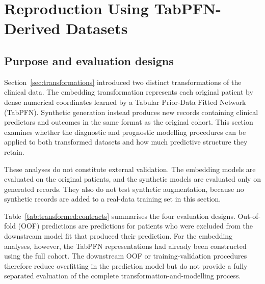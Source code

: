 \section{Reproduction Using TabPFN-Derived Datasets}
\label{sec:transformed-reproduction}

\subsection{Purpose and evaluation designs}

Section~\ref{sec:transformations} introduced two distinct transformations of the
clinical data.  The embedding transformation represents each original patient by
dense numerical coordinates learned by a Tabular Prior-Data Fitted Network
(TabPFN).  Synthetic generation instead produces new records containing clinical
predictors and outcomes in the same format as the original cohort.  This section
examines whether the diagnostic and prognostic modelling procedures can be applied
to both transformed datasets and how much predictive structure they retain.

These analyses do not constitute external validation.  The embedding models are
evaluated on the original patients, and the synthetic models are evaluated only on
generated records.  They also do not test synthetic augmentation, because no
synthetic records are added to a real-data training set in this section.

Table~\ref{tab:transformed:contracts} summarises the four evaluation designs.
Out-of-fold (OOF) predictions are predictions for patients who were excluded from
the downstream model fit that produced their prediction.  For the embedding
analyses, however, the TabPFN representations had already been constructed using
the full cohort.  The downstream OOF or training-validation procedures therefore
reduce overfitting in the prediction model but do not provide a fully separated
evaluation of the complete transformation-and-modelling process.

